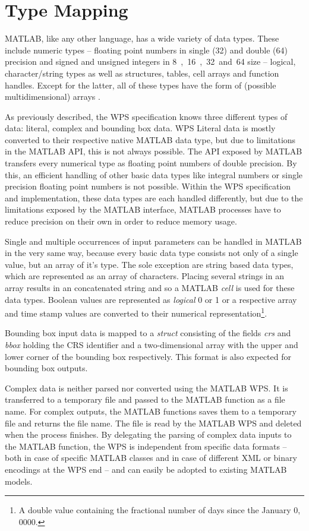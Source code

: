   \section{Type Mapping}
    \label{sec:matlab:type}
    MATLAB, like any other language, has a wide variety of data types. These include numeric types -- floating point numbers in single (\unit{32}{\bit}) and double (\unit{64}{\bit}) precision and signed and unsigned integers in \unit{8, 16, 32 and 64}{\bit} size -- logical, character/string types as well as structures, tables, cell arrays and function handles. Except for the latter, all of these types have the form of (possible multidimensional) arrays \citep{matlab}.

    As previously described, the \acl{WPS} specification knows three different types of data: literal, complex and bounding box data.
    \ac{WPS} Literal data is mostly converted to their respective native MATLAB data type, but due to limitations in the MATLAB \ac{API}, this is not always possible. The \ac{API} exposed by MATLAB transfers every numerical type as floating point numbers of double precision. By this, an efficient handling of other basic data types like integral numbers or single precision floating point numbers is not possible. Within the WPS specification and implementation, these data types are each handled differently, but due to the limitations exposed by the MATLAB interface, MATLAB processes have to reduce precision on their own in order to reduce memory usage.

    Single and multiple occurrences of input parameters can be handled in MATLAB in the very same way, because every basic data type consists not only of a single value, but an array of it's type. The sole exception are string based data types, which are represented as an array of characters. Placing several strings in an array results in an concatenated string and so a MATLAB \emph{cell} is used for these data types. Boolean values are represented as \emph{logical} 0 or 1 or a respective array and time stamp values are converted to their numerical representation\footnote{A double value containing the fractional number of days since the January 0, 0000.}.

    Bounding box input data is mapped to a \emph{struct} consisting of the fields \emph{crs} and \emph{bbox} holding the \ac{CRS} identifier and a two-dimensional array with the upper and lower corner of the bounding box respectively. This format is also expected for bounding box outputs.

    Complex data is neither parsed nor converted using the MATLAB WPS. It is transferred to a temporary file and passed to the MATLAB function as a file name. For complex outputs, the MATLAB functions saves them to a temporary file and returns the file name. The file is read by the MATLAB WPS and deleted when the process finishes. By delegating the parsing of complex data inputs to the MATLAB function, the WPS is independent from specific data formats -- both in case of specific MATLAB classes and in case of different XML or binary encodings at the WPS end -- and can easily be adopted to existing MATLAB models.

